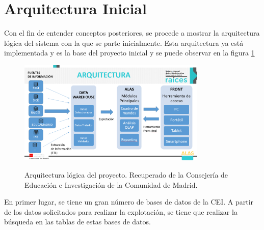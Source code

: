 \section{Arquitectura Inicial}
Con el fin de entender conceptos posteriores, se procede a mostrar la arquitectura lógica del sistema con la que se parte inicialmente. Esta arquitectura ya está implementada y es la base del proyecto inicial y se puede observar en la figura \ref{fig:arquitecturaDWH2}
\begin{figure}[h]
	\centering
	\caption{Arquitectura lógica del proyecto. Recuperado de la Consejería de Educación e Investigación de la Comunidad de Madrid.}
	\includegraphics[width=0.8\textwidth]{recursos/arquitecturaDWH2}
	\label{fig:arquitecturaDWH2}
\end{figure}
\FloatBarrier

En primer lugar, se tiene un gran número de bases de datos de la CEI. A partir de los datos solicitados para realizar la explotación, se tiene que realizar la búsqueda en las tablas de estas bases de datos.

